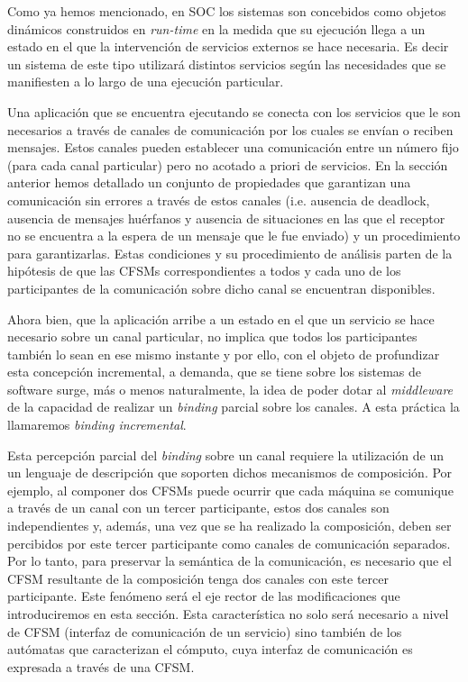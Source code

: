 
Como ya hemos mencionado, en SOC los sistemas son concebidos como objetos dinámicos construidos en \emph{run-time} en la medida que su ejecución llega a un estado en el que la intervención de servicios externos se hace necesaria. Es decir un sistema de este tipo utilizará distintos servicios según las necesidades que se manifiesten a lo largo de una ejecución particular. 
 
Una aplicación que se encuentra ejecutando se conecta con los servicios que le son necesarios a través de canales de comunicación por los cuales se envían o reciben mensajes. Estos canales pueden establecer una comunicación entre un número fijo (para cada canal particular) pero no acotado a priori de servicios. En la sección anterior hemos detallado un conjunto de propiedades que garantizan una comunicación sin errores a través de estos canales (i.e. ausencia de deadlock, ausencia de mensajes huérfanos y ausencia de situaciones en las que el receptor no se encuentra a la espera de un mensaje que le fue enviado) y un procedimiento para garantizarlas. Estas condiciones y su procedimiento de análisis parten de la hipótesis de que las CFSMs correspondientes a todos y cada uno de los participantes de la comunicación sobre dicho canal se encuentran disponibles.

Ahora bien, que la aplicación arribe a un estado en el que un servicio se hace necesario sobre un canal particular, no implica que todos los participantes también lo sean en ese mismo instante y por ello, con el objeto de profundizar esta concepción incremental, a demanda, que se tiene sobre los sistemas de software surge, más o menos naturalmente, la idea de poder dotar al \emph{middleware} de la capacidad de realizar un \emph{binding} parcial sobre los canales. A esta práctica la llamaremos \emph{binding incremental}.
 
Esta percepción parcial del \emph{binding} sobre un canal requiere la utilización de un un lenguaje de descripción que soporten dichos mecanismos de composición. Por ejemplo, al componer dos CFSMs puede ocurrir que cada máquina se comunique a través de un canal con un tercer participante, estos dos canales son independientes y, además, una vez que se ha realizado la composición, deben ser percibidos por este tercer participante como canales de comunicación separados. Por lo tanto, para preservar la semántica de la comunicación, es necesario que el CFSM resultante de la composición tenga dos canales con este tercer participante. Este fenómeno será el eje rector de las modificaciones que introduciremos en esta sección. Esta característica no solo será necesario a nivel de CFSM (interfaz de comunicación de un servicio) sino también de los autómatas que caracterizan el cómputo, cuya interfaz de comunicación es expresada a través de una CFSM.

